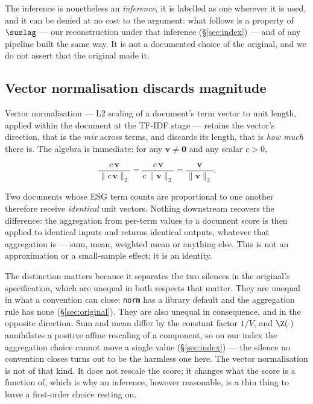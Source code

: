 The inference is nonetheless an \emph{inference}, it is labelled as one wherever it is used,
and it can be denied at no cost to the argument: what follows is a property of $\suslag$ ---
our reconstruction under that inference (\S\ref{sec:index}) --- and of any pipeline built the
same way. It is not a documented choice of the original, and we do not assert that the
original made it.

\subsection{Vector normalisation discards magnitude}

Vector normalisation --- L2 scaling of a document's term vector to unit length, applied
within the document at the TF-IDF stage --- retains the vector's direction, that is the
\emph{mix} across terms, and discards its length, that is \emph{how much} there is. The
algebra is immediate: for any $\mathbf{v} \neq \mathbf{0}$ and any scalar $c > 0$,

\begin{equation}
\frac{c\,\mathbf{v}}{\lVert c\,\mathbf{v}\rVert_2}
= \frac{c\,\mathbf{v}}{c\,\lVert \mathbf{v}\rVert_2}
= \frac{\mathbf{v}}{\lVert \mathbf{v}\rVert_2}.
\label{eq:l2-invariance}
\end{equation}

Two documents whose ESG term counts are proportional to one another therefore receive
\emph{identical} unit vectors. Nothing downstream recovers the difference: the aggregation
from per-term values to a document score is then applied to identical inputs and returns
identical outputs, whatever that aggregation is --- sum, mean, weighted mean or anything
else. This is not an approximation or a small-sample effect; it is an identity.

The distinction matters because it separates the two silences in the original's
specification, which are unequal in both respects that matter. They are unequal in what a
convention can close: \texttt{norm} has a library default and the aggregation rule has none
(\S\ref{sec:original}). They are also unequal in consequence, and in the opposite direction.
Sum and mean differ by the constant factor $1/V$, and $\Z(\cdot)$ annihilates a positive
affine rescaling of a component, so on our index the aggregation choice cannot move a single
value (\S\ref{sec:index}) --- the silence no convention closes turns out to be the harmless
one here. The vector normalisation is not of that kind. It does not rescale the score; it
changes what the score is a function of, which is why an inference, however reasonable, is a
thin thing to leave a first-order choice resting on.


